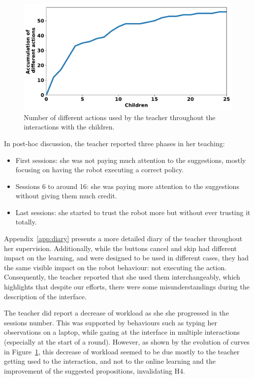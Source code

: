 \begin{figure}[ht]
	\includegraphics[width=.85\linewidth]{./number_actions.pdf}
	\centering
	\caption{Number of different actions used by the teacher throughout the interactions with the children.}
	\label{fig:tutoring_actions}
\end{figure}

In post-hoc discussion, the teacher reported three phases in her teaching: 
\begin{itemize}
	\item First sessions: she was not paying much attention to the suggestions, mostly focusing on having the robot executing a correct policy.
	\item Sessions 6 to around 16: she was paying more attention to the suggestions without giving them much credit.
	\item Last sessions: she started to trust the robot more but without ever trusting it totally.
\end{itemize}

Appendix~\ref{app:diary} presents a more detailed diary of the teacher throughout her supervision. Additionally, while the buttons cancel and skip had different impact on the learning, and were designed to be used in different cases, they had the same visible impact on the robot behaviour: not executing the action. Consequently, the teacher reported that she used them interchangeably, which highlights that despite our efforts, there were some misunderstandings during the description of the interface.

The teacher did report a decrease of workload as she she progressed in the sessions number. This was supported by behaviours such as typing her observations on a laptop, while gazing at the interface in multiple interactions (especially at the start of a round). However, as shown by the evolution of curves in Figure~\ref{fig:tutoring_actions}, this decrease of workload seemed to be due mostly to the teacher getting used to the interaction, and not to the online learning and the improvement of the suggested propositions, invalidating H4.

